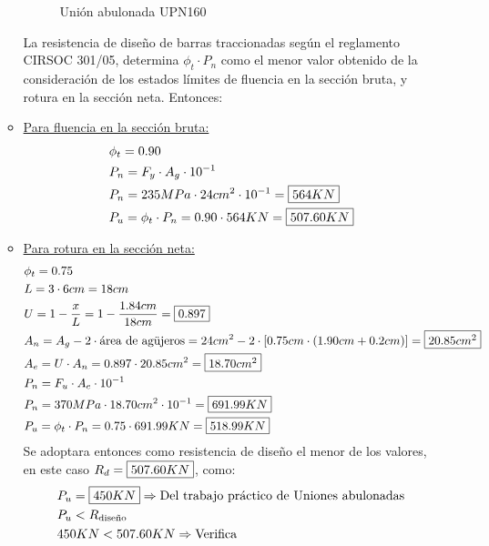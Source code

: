 \begin{enumerate}
\begin{itemize}
\begin{figure}[H]
\begin{center}
\end{center}
\caption{Unión abulonada UPN160}
\end{figure}
La resistencia de diseño de barras traccionadas según el reglamento CIRSOC 301/05, determina $\phi_t \cdot P_n$ como el menor valor obtenido de la consideración de los estados límites de fluencia en la sección bruta, y rotura en la sección neta. Entonces:\\
\item \underline{Para fluencia en la sección bruta:}
\begin{align*}
& \phi_t = 0.90 \\
& P_n = F_y \cdot A_g \cdot 10^{-1} \\
& P_n = 235MPa \cdot 24cm^2 \cdot 10^{-1} = \framebox{$564KN$}\\
& P_u = \phi_t \cdot P_n = 0.90 \cdot 564KN = \framebox{$507.60KN$}
\end{align*}

\item \underline{Para rotura en la sección neta:}
\begin{align*}
& \phi_t = 0.75 \\
& L = 3 \cdot 6cm = 18cm \\
& U = 1 - \frac{x}{L} = 1 - \frac{1.84cm}{18cm} = \framebox{$0.897$}\\
& A_n = A_g - 2 \cdot \text{área de agüjeros} = 24cm^2 - 2 \cdot [0.75cm \cdot (1.90cm + 0.2cm)] = \framebox{$20.85cm^2$}\\
& A_e = U \cdot A_n = 0.897 \cdot 20.85cm^2 = \framebox{$18.70cm^2$}\\
& P_n = F_u \cdot A_e \cdot 10^{-1} \\
& P_n = 370MPa \cdot 18.70cm^2 \cdot 10^{-1} = \framebox{$691.99KN$}\\
& P_u = \phi_t \cdot P_n = 0.75 \cdot 691.99KN = \framebox{$518.99KN$}
\end{align*}
Se adoptara entonces como resistencia de diseño el menor de los valores, en este caso $R_d = \framebox{$507.60KN$}$, como:
\begin{align*}
& P_u = \framebox{$450KN$} \Rightarrow \text{Del trabajo práctico de Uniones abulonadas}\\
& P_u < R_{\text{diseño}} \\
& 450KN < 507.60KN  \Rightarrow \text{Verifica}
\end{align*}


\end{itemize}
\end{enumerate}
